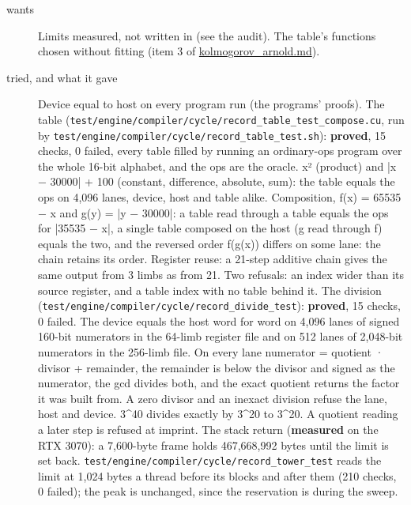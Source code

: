 \begin{description}
\item[{wants}] Limits measured, not written in (see the audit). The table's functions chosen without fitting (item 3 of \hyperref[chap:kolmogorov-arnold]{kolmogorov\_\allowbreak{}arnold.md}).
\item[{tried, and what it gave}] Device equal to host on every program run (the programs' proofs). The table (\texttt{test/\allowbreak{}engine/\allowbreak{}compiler/\allowbreak{}cycle/\allowbreak{}record\_\allowbreak{}table\_\allowbreak{}test\_\allowbreak{}compose.\allowbreak{}cu}, run by \texttt{test/\allowbreak{}engine/\allowbreak{}compiler/\allowbreak{}cycle/\allowbreak{}record\_\allowbreak{}table\_\allowbreak{}test.\allowbreak{}sh}): \textbf{proved}, 15 checks, 0 failed, every table filled by running an ordinary-ops program over the whole 16-bit alphabet, and the ops are the oracle. x² (product) and |x − 30000| + 100 (constant, difference, absolute, sum): the table equals the ops on 4,096 lanes, device, host and table alike. Composition, f(x) = 65535 − x and g(y) = |y − 30000|: a table read through a table equals the ops for |35535 − x|, a single table composed on the host (g read through f) equals the two, and the reversed order f(g(x)) differs on some lane: the chain retains its order. Register reuse: a 21-step additive chain gives the same output from 3 limbs as from 21. Two refusals: an index wider than its source register, and a table index with no table behind it. The division (\texttt{test/\allowbreak{}engine/\allowbreak{}compiler/\allowbreak{}cycle/\allowbreak{}record\_\allowbreak{}divide\_\allowbreak{}test}): \textbf{proved}, 15 checks, 0 failed. The device equals the host word for word on 4,096 lanes of signed 160-bit numerators in the 64-limb register file and on 512 lanes of 2,048-bit numerators in the 256-limb file. On every lane numerator = quotient · divisor + remainder, the remainder is below the divisor and signed as the numerator, the gcd divides both, and the exact quotient returns the factor it was built from. A zero divisor and an inexact division refuse the lane, host and device. 3\textasciicircum{}40 divides exactly by 3\textasciicircum{}20 to 3\textasciicircum{}20. A quotient reading a later step is refused at imprint. The stack return (\textbf{measured} on the RTX 3070): a 7,600-byte frame holds 467,668,992 bytes until the limit is set back. \texttt{test/\allowbreak{}engine/\allowbreak{}compiler/\allowbreak{}cycle/\allowbreak{}record\_\allowbreak{}tower\_\allowbreak{}test} reads the limit at 1,024 bytes a thread before its blocks and after them (210 checks, 0 failed); the peak is unchanged, since the reservation is during the sweep.

\end{description}
